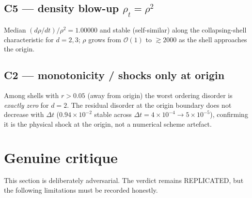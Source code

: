 \documentclass[11pt]{article}
\begin{document}
\subsection*{C5 --- density blow-up $\rho_t=\rho^2$}
Median $(d\rho/dt)/\rho^2 = 1.00000$ and stable (self-similar) along the
collapsing-shell characteristic for $d=2,3$; $\rho$ grows from $\mathcal{O}(1)$
to $\gtrsim 2000$ as the shell approaches the origin.

\subsection*{C2 --- monotonicity / shocks only at origin}
Among shells with $r>0.05$ (away from origin) the worst ordering disorder is
\emph{exactly zero} for $d=2$. The residual disorder at the origin boundary
does not decrease with $\Delta t$
($0.94\!\times\!10^{-2}$ stable across $\Delta t = 4\!\times\!10^{-4}\to
5\!\times\!10^{-5}$), confirming it is the physical shock at the origin,
not a numerical scheme artefact.

\section{Genuine critique}
\label{sec:critique}
This section is deliberately adversarial. The verdict remains REPLICATED, but
the following limitations must be recorded honestly.
\end{document}
